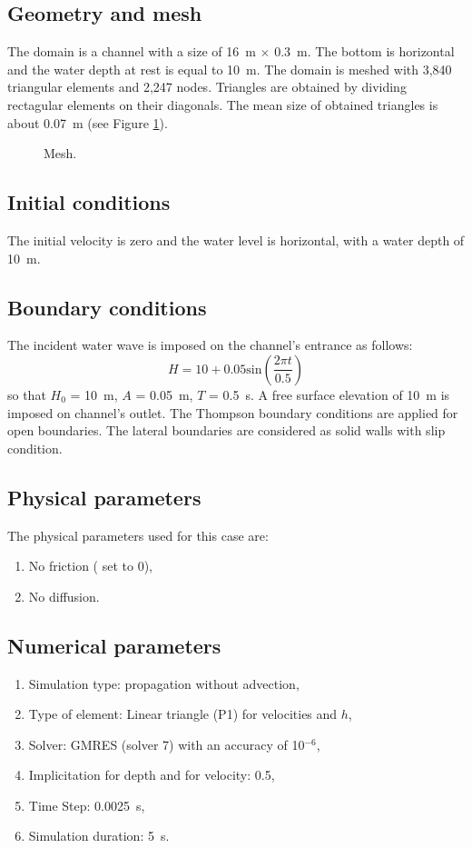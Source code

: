 \subsection{Geometry and mesh}
The domain is a channel with a size of 16~m $\times$ 0.3~m. The bottom is horizontal and
the water depth at rest is equal to 10~m.
The domain is meshed with 3,840 triangular elements and 2,247 nodes.
Triangles are obtained by dividing rectagular elements on their diagonals.
The mean size of obtained triangles is about 0.07~m (see Figure \ref{fig:wave:mesh}).

\begin{figure}[H]
 \centering
 \caption{Mesh.}
 \label{fig:wave:mesh}
\end{figure}

\subsection{Initial conditions}
The initial velocity is zero and the water level is horizontal, with a water depth of 10~m.
\subsection{Boundary conditions}
The incident water wave is imposed on the channel's entrance as follows:
\begin{equation}
    H = 10 + 0.05 \text{sin}\left( \dfrac{2\pi t}{0.5} \right)
\end{equation}
so that $H_0$ = 10~m, $A$ = 0.05~m, $T$ = 0.5~s.
A free surface elevation of 10~m is imposed on channel's outlet.
The Thompson boundary conditions are applied for open boundaries.
The lateral boundaries are considered as solid walls with slip condition.
\subsection{Physical parameters}
The physical parameters used for this case are:
\begin{enumerate}
\item No friction ( set to 0),
\item No diffusion.
\end{enumerate}
\subsection{Numerical parameters}
\begin{enumerate}
\item Simulation type: propagation without advection,
\item Type of element: Linear triangle (P1) for velocities and $h$,
\item Solver: GMRES (solver 7) with an accuracy of 10$^{-6}$,
\item Implicitation for depth and for velocity: 0.5,
\item Time Step: 0.0025~s,
\item Simulation duration: 5~s.
\end{enumerate}

